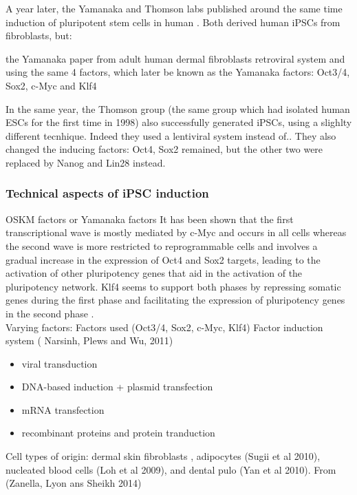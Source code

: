 A year later, the Yamanaka and Thomson labs published around the same time induction of pluripotent stem cells in human \cite{takahashi2007induction}.
Both derived human iPSCs from fibroblasts, but:

the Yamanaka paper from adult human dermal fibroblasts 
retroviral system and using the same 4 factors, which later be known as the Yamanaka factors: Oct3/4, Sox2, c-Myc and Klf4

In the same year, the Thomson group (the same group which had isolated human ESCs for the first time in 1998) also successfully generated iPSCs, using a slighlty different tecnhique.
Indeed they used a lentiviral system instead of..
They also changed the inducing factors: Oct4, Sox2 remained, but the other two were replaced by Nanog and Lin28 instead.

\subsubsection{Technical aspects of iPSC induction}

OSKM factors or Yamanaka factors
It has been shown that the first transcriptional wave is mostly mediated by c-Myc and occurs in all cells whereas the second wave is more restricted to reprogrammable cells and involves a gradual increase in the expression of Oct4 and Sox2 targets, leading to the activation of other pluripotency genes that aid in the activation of the pluripotency network. Klf4 seems to support both phases by repressing somatic genes during the first phase and facilitating the expression of pluripotency genes in the second phase \cite{buganim2013mechanisms}.\\

Varying factors:
Factors used (Oct3/4, Sox2, c-Myc, Klf4)
Factor induction system (\cite{narsinh2011comparison} Narsinh, Plews and Wu, 2011)
\begin{itemize}
    \item viral transduction
    \item DNA-based induction + plasmid transfection
    \item mRNA transfection
    \item recombinant proteins and protein tranduction
\end{itemize}
Cell types of origin: dermal skin fibroblasts \cite{takahashi2007induction},
adipocytes (Sugii et al 2010), nucleated blood cells (Loh et al 2009),
and dental pulo (Yan et al 2010). From \cite{} (Zanella, Lyon ans Sheikh 2014)

